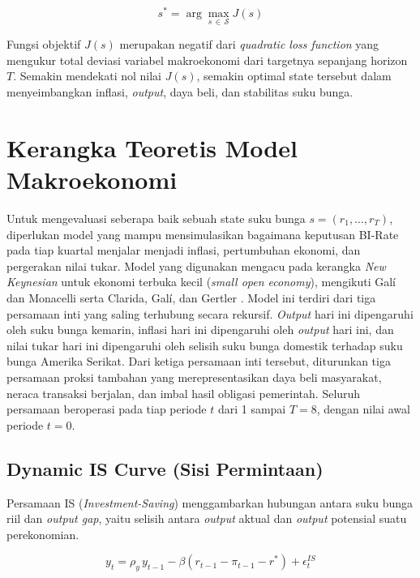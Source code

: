 \[
    s^{*} = \arg\max_{s \,\in\, \mathcal{S}} J(s)
\]

Fungsi objektif $J(s)$ merupakan negatif dari \textit{quadratic loss function} yang mengukur total deviasi variabel makroekonomi dari targetnya sepanjang horizon $T$. Semakin mendekati nol nilai $J(s)$, semakin optimal state tersebut dalam menyeimbangkan inflasi, \textit{output}, daya beli, dan stabilitas suku bunga.

\section{Kerangka Teoretis Model Makroekonomi}

Untuk mengevaluasi seberapa baik sebuah state suku bunga $s = (r_1, \dots, r_T)$, diperlukan model yang mampu mensimulasikan bagaimana keputusan BI-Rate pada tiap kuartal menjalar menjadi inflasi, pertumbuhan ekonomi, dan pergerakan nilai tukar. Model yang digunakan mengacu pada kerangka \textit{New Keynesian} untuk ekonomi terbuka kecil (\textit{small open economy}), mengikuti Galí dan Monacelli \cite{gali2005} serta Clarida, Galí, dan Gertler \cite{clarida1999}. Model ini terdiri dari tiga persamaan inti yang saling terhubung secara rekursif. \textit{Output} hari ini dipengaruhi oleh suku bunga kemarin, inflasi hari ini dipengaruhi oleh \textit{output} hari ini, dan nilai tukar hari ini dipengaruhi oleh selisih suku bunga domestik terhadap suku bunga Amerika Serikat. Dari ketiga persamaan inti tersebut, diturunkan tiga persamaan proksi tambahan yang merepresentasikan daya beli masyarakat, neraca transaksi berjalan, dan imbal hasil obligasi pemerintah. Seluruh persamaan beroperasi pada tiap periode $t$ dari 1 sampai $T = 8$, dengan nilai awal periode $t = 0$.

\subsection{Dynamic IS Curve (Sisi Permintaan)}

Persamaan IS (\textit{Investment-Saving}) menggambarkan hubungan antara suku bunga riil dan \textit{output gap}, yaitu selisih antara \textit{output} aktual dan \textit{output} potensial suatu perekonomian.

\[
    y_t = \rho_y \, y_{t-1} - \beta \left( r_{t-1} - \pi_{t-1} - r^{*} \right) + \epsilon_t^{IS}
\]

